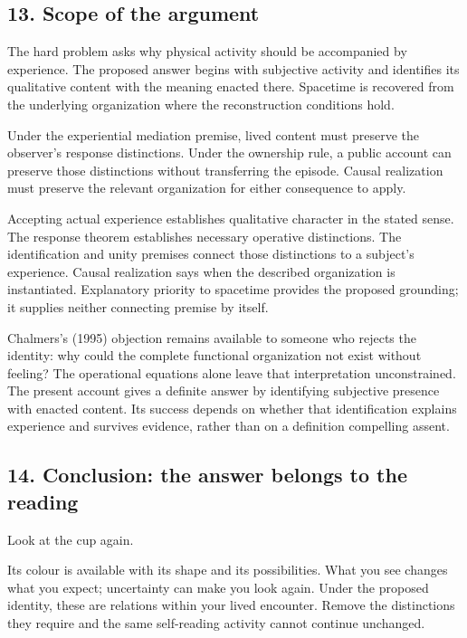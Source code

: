\documentclass[
  11pt,
]{article}
\begin{document}
\subsection{13. Scope of the argument}\label{scope-of-the-argument}

The hard problem asks why physical activity should be accompanied by
experience. The proposed answer begins with subjective activity and
identifies its qualitative content with the meaning enacted there.
Spacetime is recovered from the underlying organization where the
reconstruction conditions hold.

Under the experiential mediation premise, lived content must preserve
the observer's response distinctions. Under the ownership rule, a public
account can preserve those distinctions without transferring the
episode. Causal realization must preserve the relevant organization for
either consequence to apply.

Accepting actual experience establishes qualitative character in the
stated sense. The response theorem establishes necessary operative
distinctions. The identification and unity premises connect those
distinctions to a subject's experience. Causal realization says when the
described organization is instantiated. Explanatory priority to
spacetime provides the proposed grounding; it supplies neither
connecting premise by itself.

Chalmers's (1995) objection remains available to someone who rejects the
identity: why could the complete functional organization not exist
without feeling? The operational equations alone leave that
interpretation unconstrained. The present account gives a definite
answer by identifying subjective presence with enacted content. Its
success depends on whether that identification explains experience and
survives evidence, rather than on a definition compelling assent.

\newpage

\subsection{14. Conclusion: the answer belongs to the
reading}\label{conclusion-the-answer-belongs-to-the-reading}

Look at the cup again.

Its colour is available with its shape and its possibilities. What you
see changes what you expect; uncertainty can make you look again. Under
the proposed identity, these are relations within your lived encounter.
Remove the distinctions they require and the same self-reading activity
cannot continue unchanged.
\end{document}
